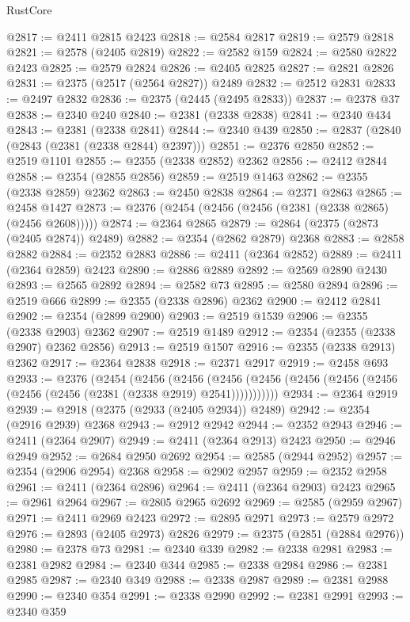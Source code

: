 \begin{lexlean}{RustCore}
\begin{coremodule}
@2817 := @2411 @2815 @2423
@2818 := @2584 @2817
@2819 := @2579 @2818
@2821 := @2578 (@2405 @2819)
@2822 := @2582 @159
@2824 := @2580 @2822 @2423
@2825 := @2579 @2824
@2826 := @2405 @2825
@2827 := @2821 @2826
@2831 := @2375 (@2517 (@2564 @2827)) @2489
@2832 := @2512 @2831
@2833 := @2497 @2832
@2836 := @2375 (@2445 (@2495 @2833))
@2837 := @2378 @37
@2838 := @2340 @240
@2840 := @2381 (@2338 @2838)
@2841 := @2340 @434
@2843 := @2381 (@2338 @2841)
@2844 := @2340 @439
@2850 := @2837 (@2840 (@2843 (@2381 (@2338 @2844) @2397)))
@2851 := @2376 @2850
@2852 := @2519 @1101
@2855 := @2355 (@2338 @2852) @2362
@2856 := @2412 @2844
@2858 := @2354 (@2855 @2856)
@2859 := @2519 @1463
@2862 := @2355 (@2338 @2859) @2362
@2863 := @2450 @2838
@2864 := @2371 @2863
@2865 := @2458 @1427
@2873 := @2376 (@2454 (@2456 (@2456 (@2381 (@2338 @2865) (@2456 @2608)))))
@2874 := @2364 @2865
@2879 := @2864 (@2375 (@2873 (@2405 @2874)) @2489)
@2882 := @2354 (@2862 @2879) @2368
@2883 := @2858 @2882
@2884 := @2352 @2883
@2886 := @2411 (@2364 @2852)
@2889 := @2411 (@2364 @2859) @2423
@2890 := @2886 @2889
@2892 := @2569 @2890 @2430
@2893 := @2565 @2892
@2894 := @2582 @73
@2895 := @2580 @2894
@2896 := @2519 @666
@2899 := @2355 (@2338 @2896) @2362
@2900 := @2412 @2841
@2902 := @2354 (@2899 @2900)
@2903 := @2519 @1539
@2906 := @2355 (@2338 @2903) @2362
@2907 := @2519 @1489
@2912 := @2354 (@2355 (@2338 @2907) @2362 @2856)
@2913 := @2519 @1507
@2916 := @2355 (@2338 @2913) @2362
@2917 := @2364 @2838
@2918 := @2371 @2917
@2919 := @2458 @693
@2933 := @2376
    (@2454
      (@2456
        (@2456
          (@2456 (@2456 (@2456 (@2456 (@2456 (@2456 (@2456 (@2381 (@2338 @2919) @2541)))))))))))
@2934 := @2364 @2919
@2939 := @2918 (@2375 (@2933 (@2405 @2934)) @2489)
@2942 := @2354 (@2916 @2939) @2368
@2943 := @2912 @2942
@2944 := @2352 @2943
@2946 := @2411 (@2364 @2907)
@2949 := @2411 (@2364 @2913) @2423
@2950 := @2946 @2949
@2952 := @2684 @2950 @2692
@2954 := @2585 (@2944 @2952)
@2957 := @2354 (@2906 @2954) @2368
@2958 := @2902 @2957
@2959 := @2352 @2958
@2961 := @2411 (@2364 @2896)
@2964 := @2411 (@2364 @2903) @2423
@2965 := @2961 @2964
@2967 := @2805 @2965 @2692
@2969 := @2585 (@2959 @2967)
@2971 := @2411 @2969 @2423
@2972 := @2895 @2971
@2973 := @2579 @2972
@2976 := @2893 (@2405 @2973) @2826
@2979 := @2375 (@2851 (@2884 @2976))
@2980 := @2378 @73
@2981 := @2340 @339
@2982 := @2338 @2981
@2983 := @2381 @2982
@2984 := @2340 @344
@2985 := @2338 @2984
@2986 := @2381 @2985
@2987 := @2340 @349
@2988 := @2338 @2987
@2989 := @2381 @2988
@2990 := @2340 @354
@2991 := @2338 @2990
@2992 := @2381 @2991
@2993 := @2340 @359

\end{coremodule}
\end{lexlean}
